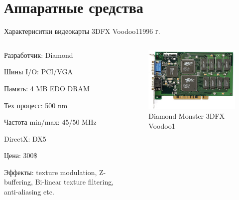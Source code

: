 \documentclass{beamer}
\begin{document}
\section{Аппаратные средства}

\begin{frame}{Характериситки видеокарты 3DFX Voodoo1}{1996 г.}
	\begin{columns}
		\begin{column}{0.5\textwidth}
			Разработчик: Diamond
			
			Шины I/O: PCI/VGA
			
			Память: 4 MB EDO DRAM
			
			Тех процесс: 500 nm
			
			Частота min/max: 45/50 MHz
			
			DirectX: DX5
			
			Цена: 300\$
			
			Эффекты: texture modulation, Z-buffering, Bi-linear texture filtering, anti-aliasing etc.
		\end{column}
		\begin{column}{0.5\textwidth}
			\begin{figure} 
				\includegraphics[width=\textwidth]{images/Diamond_Monster_3D_3DFX_Voodoo1.png}
				\caption {Diamond Monster 3DFX Voodoo1}
			\end{figure}
			
		\end{column}
	\end{columns}
\end{frame}
\end{document}
